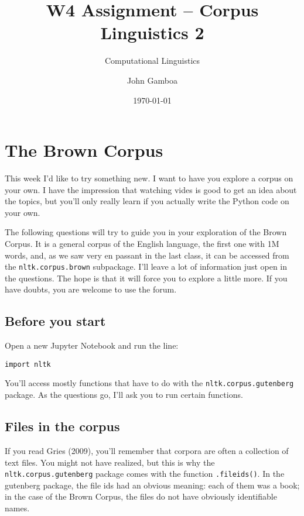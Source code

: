 \documentclass[a4paper,11pt]{scrartcl}
\title{W4 Assignment -- Corpus Linguistics 2}
\subtitle{Computational Linguistics}
\author{John Gamboa}
\date{\today}
\begin{document}
\maketitle

\section{The Brown Corpus}

This week I'd like to try something new. I want to have you explore a corpus on
your own. I have the impression that watching vides is good to get an idea about
the topics, but you'll only really learn if you actually write the Python code
on your own.

The following questions will try to guide you in your exploration of the Brown
Corpus. It is a general corpus of the English language, the first one with 1M
words, and, as we saw very en passant in the last class, it can be accessed from
the \verb|nltk.corpus.brown| subpackage. I'll leave a lot of information just
open in the questions. The hope is that it will force you to explore a little
more. If you have doubts, you are welcome to use the forum.

\subsection*{Before you start}

Open a new Jupyter Notebook and run the line:

\begin{verbatim}
import nltk
\end{verbatim}

You'll access mostly functions that have to do with the
\verb|nltk.corpus.gutenberg| package. As the questions go, I'll ask you to
run certain functions.


\subsection{Files in the corpus}

If you read Gries (2009), you'll remember that corpora are often a collection
of text files. You might not have realized, but this is why the
\verb|nltk.corpus.gutenberg| package comes with the function \verb|.fileids()|.
In the gutenberg package, the file ids had an obvious meaning: each of them was
a book; in the case of the Brown Corpus, the files do not have obviously
identifiable names.
\end{document}
